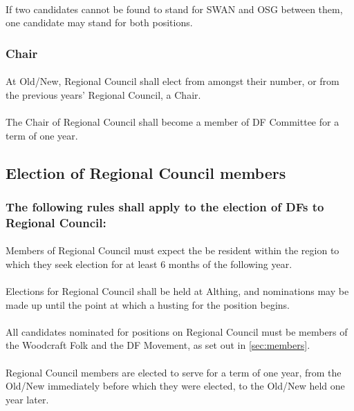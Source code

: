 \documentclass[a4paper, 12pt]{report}
\begin{document}
\paragraph{} If two candidates cannot be found to stand for SWAN and OSG between them, one candidate may stand for both positions.
\subsubsection{Chair}
\label{sec:rcchair}
\paragraph{} At Old/New, Regional Council shall elect from amongst their number, or from the previous years' Regional Council, a Chair.

\paragraph{} The Chair of Regional Council shall become a member of DF Committee for a term of one year.

\subsection{Election of Regional Council members}
\subsubsection{The following rules shall apply to the election of DFs to Regional Council:}
\paragraph{}
\label{sec:regionalresidency}
Members of Regional Council must expect the be resident within the region to which they seek election for at least 6 months of the following year.
\paragraph{}
Elections for Regional Council shall be held at Althing, and nominations may be made up until the point at which a husting for the position begins.
\paragraph{}
All candidates nominated for positions on Regional Council must be members of the Woodcraft Folk and the DF Movement, as set out in \ref{sec:members}.
\paragraph{}
Regional Council members are elected to serve for a term of one year, from the Old/New immediately before which they were elected, to the Old/New held one year later.
\end{document}
